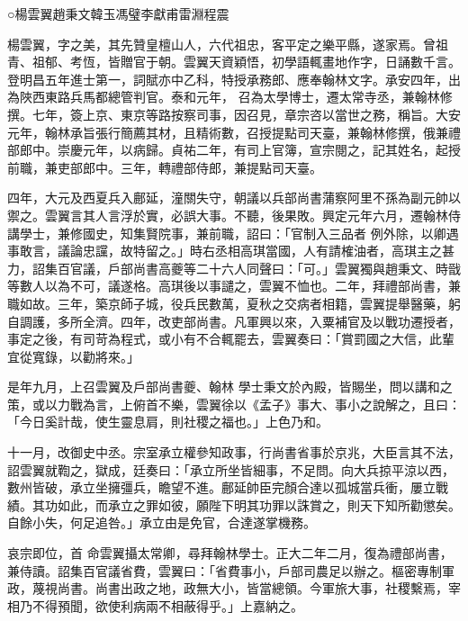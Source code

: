 
\begin{pinyinscope}

 ○楊雲翼趙秉文韓玉馮璧李獻甫雷淵程震



 楊雲翼，字之美，其先贊皇檀山人，六代祖忠，客平定之樂平縣，遂家焉。曾祖青、祖郁、考恆，皆贈官于朝。雲翼天資穎悟，初學語輒畫地作字，日誦數千言。登明昌五年進士第一，詞賦亦中乙科，特授承務郎、應奉翰林文字。承安四年，出為陜西東路兵馬都總管判官。泰和元年，
 召為太學博士，遷太常寺丞，兼翰林修撰。七年，簽上京、東京等路按察司事，因召見，章宗咨以當世之務，稱旨。大安元年，翰林承旨張行簡薦其材，且精術數，召授提點司天臺，兼翰林修撰，俄兼禮部郎中。崇慶元年，以病歸。貞祐二年，有司上官簿，宣宗閱之，記其姓名，起授前職，兼吏部郎中。三年，轉禮部侍郎，兼提點司天臺。



 四年，大元及西夏兵入鄜延，潼關失守，朝議以兵部尚書蒲察阿里不孫為副元帥以禦之。雲翼言其人言浮於實，必誤大事。不聽，後果敗。興定元年六月，遷翰林侍講學士，兼修國史，知集賢院事，兼前職，詔曰：「官制入三品者
 例外除，以卿遇事敢言，議論忠讜，故特留之。」時右丞相高琪當國，人有請榷油者，高琪主之甚力，詔集百官議，戶部尚書高夔等二十六人同聲曰：「可。」雲翼獨與趙秉文、時戩等數人以為不可，議遂格。高琪後以事譴之，雲翼不恤也。二年，拜禮部尚書，兼職如故。三年，築京師子城，役兵民數萬，夏秋之交病者相籍，雲翼提舉醫藥，躬自調護，多所全濟。四年，改吏部尚書。凡軍興以來，入粟補官及以戰功遷授者，事定之後，有司苛為程式，或小有不合輒罷去，雲翼奏曰：「賞罰國之大信，此輩宜從寬錄，以勸將來。」



 是年九月，上召雲翼及戶部尚書夔、翰林
 學士秉文於內殿，皆賜坐，問以講和之策，或以力戰為言，上俯首不樂，雲翼徐以《孟子》事大、事小之說解之，且曰：「今日奚計哉，使生靈息肩，則社稷之福也。」上色乃和。



 十一月，改御史中丞。宗室承立權參知政事，行尚書省事於京兆，大臣言其不法，詔雲翼就鞫之，獄成，廷奏曰：「承立所坐皆細事，不足問。向大兵掠平涼以西，數州皆破，承立坐擁彊兵，瞻望不進。鄜延帥臣完顏合達以孤城當兵衝，屢立戰績。其功如此，而承立之罪如彼，願陛下明其功罪以誅賞之，則天下知所勸懲矣。自餘小失，何足追咎。」承立由是免官，合達遂掌機務。



 哀宗即位，首
 命雲翼攝太常卿，尋拜翰林學士。正大二年二月，復為禮部尚書，兼侍讀。詔集百官議省費，雲翼曰：「省費事小，戶部司農足以辦之。樞密專制軍政，蔑視尚書。尚書出政之地，政無大小，皆當總領。今軍旅大事，社稷繫焉，宰相乃不得預聞，欲使利病兩不相蔽得乎。」上嘉納之。




\end{pinyinscope}
